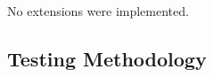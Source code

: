 \documentclass[11pt]{article}
\begin{document}

\noindent No extensions were implemented.

\subsection*{Testing Methodology}

%
\end{document}
